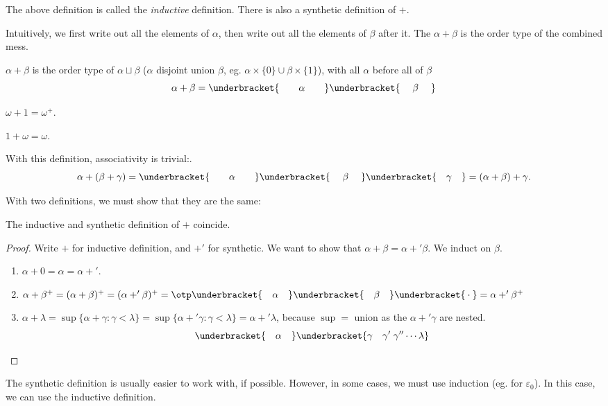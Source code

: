 \documentclass[a4paper]{article}
\begin{document}
The above definition is called the \emph{inductive} definition. There is also a synthetic definition of $+$.

Intuitively, we first write out all the elements of $\alpha$, then write out all the elements of $\beta$ after it. The $\alpha + \beta$ is the order type of the combined mess.

\begin{defi}
  $\alpha + \beta$ is the order type of $\alpha \sqcup \beta$ ($\alpha$ disjoint union $\beta$, eg. $\alpha\times \{0\}\cup \beta\times \{1\}$), with all $\alpha$ before all of $\beta$
  \[
    \alpha + \beta = \underbracket{\quad\quad\vphantom{\beta}\alpha\vphantom{\beta}\quad\quad}\underbracket{\quad\;\beta\;\quad}
  \]
\end{defi}
\begin{eg}
  $\omega + 1 = \omega^+$.

  $1 + \omega = \omega$.
\end{eg}

With this definition, associativity is trivial:.
\[
  \alpha + (\beta + \gamma) = \underbracket{\quad\quad\vphantom{\beta}\alpha\vphantom{\beta}\quad\quad}\underbracket{\quad\;\beta\;\quad}\underbracket{\quad\gamma\quad} = (\alpha + \beta) + \gamma.
\]

With two definitions, we must show that they are the same:
\begin{prop}
  The inductive and synthetic definition of $+$ coincide.
\end{prop}

\begin{proof}
  Write $+$ for inductive definition, and $+'$ for synthetic. We want to show that $\alpha + \beta = \alpha +' \beta$. We induct on $\beta$.

  \begin{enumerate}
    \item $\alpha + 0 = \alpha = \alpha +' $.
    \item $\alpha + \beta^+ = (\alpha + \beta)^+ = (\alpha +' \beta)^+ = \otp\underbracket{\quad\vphantom\beta\alpha\vphantom\beta\quad}\underbracket{\quad\beta\quad}\underbracket{\vphantom\beta\cdot\vphantom\beta} = \alpha +' \beta^+$
    \item $\alpha + \lambda = \sup\{\alpha + \gamma: \gamma < \lambda\} = \sup \{\alpha +' \gamma: \gamma < \lambda\} = \alpha +' \lambda$, because $\sup = $ union as the $\alpha +' \gamma$ are nested.
      \[
        \underbracket{\quad\vphantom\gamma\alpha\vphantom\gamma\quad}\underbracket{\gamma\quad\gamma'\;\gamma''\cdots \lambda}
      \]
  \end{enumerate}
\end{proof}
The synthetic definition is usually easier to work with, if possible. However, in some cases, we must use induction (eg. for $\varepsilon_0$). In this case, we can use the inductive definition.
\end{document}

